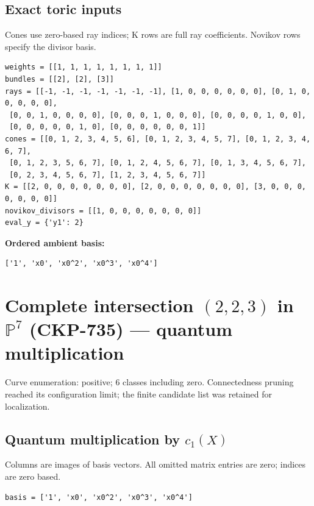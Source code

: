 \documentclass[10pt,a4paper]{article}
\begin{document}
\subsection*{Exact toric inputs}
Cones use zero-based ray indices; K rows are full ray coefficients. Novikov rows specify the divisor basis.

\begin{lstlisting}
weights = [[1, 1, 1, 1, 1, 1, 1, 1]]
bundles = [[2], [2], [3]]
rays = [[-1, -1, -1, -1, -1, -1, -1], [1, 0, 0, 0, 0, 0, 0], [0, 1, 0, 0, 0, 0, 0],
 [0, 0, 1, 0, 0, 0, 0], [0, 0, 0, 1, 0, 0, 0], [0, 0, 0, 0, 1, 0, 0],
 [0, 0, 0, 0, 0, 1, 0], [0, 0, 0, 0, 0, 0, 1]]
cones = [[0, 1, 2, 3, 4, 5, 6], [0, 1, 2, 3, 4, 5, 7], [0, 1, 2, 3, 4, 6, 7],
 [0, 1, 2, 3, 5, 6, 7], [0, 1, 2, 4, 5, 6, 7], [0, 1, 3, 4, 5, 6, 7],
 [0, 2, 3, 4, 5, 6, 7], [1, 2, 3, 4, 5, 6, 7]]
K = [[2, 0, 0, 0, 0, 0, 0, 0], [2, 0, 0, 0, 0, 0, 0, 0], [3, 0, 0, 0, 0, 0, 0, 0]]
novikov_divisors = [[1, 0, 0, 0, 0, 0, 0, 0]]
eval_y = {'y1': 2}
\end{lstlisting}

\textbf{Ordered ambient basis:}
\begin{lstlisting}
['1', 'x0', 'x0^2', 'x0^3', 'x0^4']
\end{lstlisting}

\clearpage\section*{Complete intersection $(2,2,3)$ in $\mathbb P^{7}$ (CKP-735) --- quantum multiplication}

Curve enumeration: positive; 6 classes including zero.
Connectedness pruning reached its configuration limit; the finite candidate list was retained for localization.
\subsection*{Quantum multiplication by $c_1(X)$}
Columns are images of basis vectors. All omitted matrix entries are zero; indices are zero based.

\begin{lstlisting}
basis = ['1', 'x0', 'x0^2', 'x0^3', 'x0^4']
\end{lstlisting}
\end{document}

